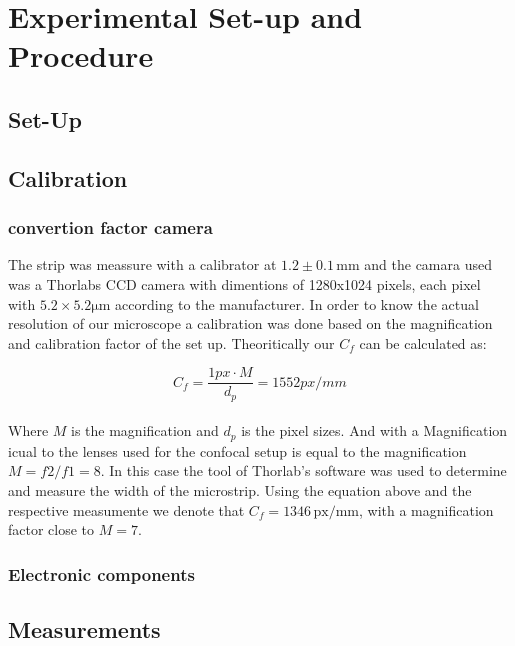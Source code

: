 \section{Experimental Set-up and Procedure}
\subsection{Set-Up}

\subsection{Calibration}
\subsubsection{convertion factor camera}
The strip was meassure with a calibrator at $1.2\pm 0.1\,\mathrm{mm}$ and the camara used was a Thorlabs CCD camera with dimentions of 1280x1024 pixels, each pixel with $5.2\times5.2 \mathrm{\mu m}$ according to the manufacturer.
In order to know the actual resolution of our microscope a calibration was done based on the magnification and calibration factor of the set up.
Theoritically our $C_{f}$ can be calculated as:

\begin{equation}
C_{f}=\dfrac{1 px \cdot M}{d_{p}} = 1552 px/mm
\end{equation}\\
Where $M$ is the magnification and $d_{p}$ is the pixel sizes. And with a Magnification icual to the lenses used for the confocal setup is equal to the magnification $M=f2/f1=8$.
In this case the tool of Thorlab’s software was used to determine and measure the width of the microstrip. Using the equation above and the respective measumente we denote that  $C_{f} =1346 \,\mathrm{px/mm}$, with a magnification factor close to $M=7$.


\subsubsection{Electronic components}



\subsection{Measurements}